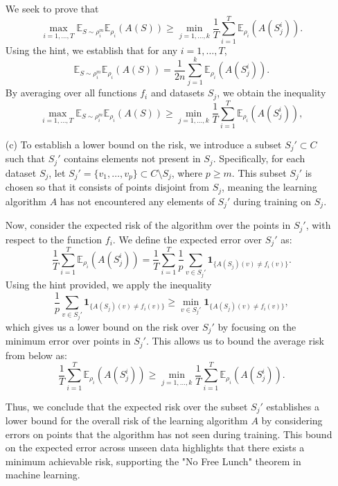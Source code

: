 \documentclass{article}
\begin{document}
\begin{itemize}
    We seek to prove that
    \[
    \max_{i=1, \dots, T} \mathbb{E}_{S \sim \rho_i^m} \mathbb{E}_{\rho_i}(A(S)) \ge \min_{j=1, \dots, k} \frac{1}{T} \sum_{i=1}^T \mathbb{E}_{\rho_i}(A(S_j^i)).
    \]
    Using the hint, we establish that for any \( i = 1, \dots, T \),
    \[
    \mathbb{E}_{S \sim \rho_i^m} \mathbb{E}_{\rho_i}(A(S)) = \frac{1}{2n} \sum_{j=1}^k \mathbb{E}_{\rho_i}(A(S_j^i)).
    \]
    By averaging over all functions \( f_i \) and datasets \( S_j \), we obtain the inequality
    \[
    \max_{i=1, \dots, T} \mathbb{E}_{S \sim \rho_i^m} \mathbb{E}_{\rho_i}(A(S)) \ge \min_{j=1, \dots, k} \frac{1}{T} \sum_{i=1}^T \mathbb{E}_{\rho_i}(A(S_j^i)),
    \]
    \item[(c)] To establish a lower bound on the risk, we introduce a subset \( S_j' \subset C \) such that \( S_j' \) contains elements not present in \( S_j \). Specifically, for each dataset \( S_j \), let \( S_j' = \{v_1, \dots, v_p\} \subset C \setminus S_j \), where \( p \ge m \). This subset \( S_j' \) is chosen so that it consists of points disjoint from \( S_j \), meaning the learning algorithm \( A \) has not encountered any elements of \( S_j' \) during training on \( S_j \).

    Now, consider the expected risk of the algorithm over the points in \( S_j' \), with respect to the function \( f_i \). We define the expected error over \( S_j' \) as:
    \[
    \frac{1}{T} \sum_{i=1}^T \mathbb{E}_{\rho_i}(A(S_j^i)) = \frac{1}{T} \sum_{i=1}^T \frac{1}{p} \sum_{v \in S_j'} \mathbf{1}_{\{A(S_j)(v) \neq f_i(v)\}}.
    \]
    Using the hint provided, we apply the inequality
    \[
    \frac{1}{p} \sum_{v \in S_j'} \mathbf{1}_{\{A(S_j)(v) \neq f_i(v)\}} \geq \min_{v \in S_j'} \mathbf{1}_{\{A(S_j)(v) \neq f_i(v)\}},
    \]
    which gives us a lower bound on the risk over \( S_j' \) by focusing on the minimum error over points in \( S_j' \). This allows us to bound the average risk from below as:
    \[
    \frac{1}{T} \sum_{i=1}^T \mathbb{E}_{\rho_i}(A(S_j^i)) \geq \min_{j=1, \dots, k} \frac{1}{T} \sum_{i=1}^T \mathbb{E}_{\rho_i}(A(S_j^i)).
    \]
    
    Thus, we conclude that the expected risk over the subset \( S_j' \) establishes a lower bound for the overall risk of the learning algorithm \( A \) by considering errors on points that the algorithm has not seen during training. This bound on the expected error across unseen data highlights that there exists a minimum achievable risk, supporting the "No Free Lunch" theorem in machine learning.


\end{itemize}
\end{document}
